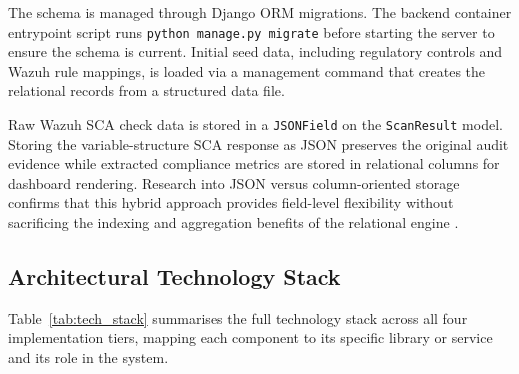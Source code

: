 The schema is managed through Django ORM migrations. The backend container entrypoint script runs \texttt{python manage.py migrate} before starting the server to ensure the schema is current. Initial seed data, including regulatory controls and Wazuh rule mappings, is loaded via a management command that creates the relational records from a structured data file.

Raw Wazuh SCA check data is stored in a \texttt{JSONField} on the \texttt{ScanResult} model. Storing the variable-structure SCA response as JSON preserves the original audit evidence while extracted compliance metrics are stored in relational columns for dashboard rendering. Research into JSON versus column-oriented storage confirms that this hybrid approach provides field-level flexibility without sacrificing the indexing and aggregation benefits of the relational engine \cite{aji2026evaluating}.

\subsection{Architectural Technology Stack}

Table~\ref{tab:tech_stack} summarises the full technology stack across all four implementation tiers, mapping each component to its specific library or service and its role in the system.

